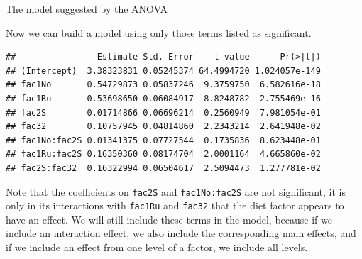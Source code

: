 \documentclass[
  ignorenonframetext,
]{beamer}
\newenvironment{Shaded}{\begin{snugshade}}{\end{snugshade}}
\newcommand{\DataTypeTok}[1]{\textcolor[rgb]{0.13,0.29,0.53}{#1}}
\newcommand{\KeywordTok}[1]{\textcolor[rgb]{0.13,0.29,0.53}{\textbf{#1}}}
\newcommand{\NormalTok}[1]{#1}
\newcommand{\OperatorTok}[1]{\textcolor[rgb]{0.81,0.36,0.00}{\textbf{#1}}}
\newcommand{\StringTok}[1]{\textcolor[rgb]{0.31,0.60,0.02}{#1}}
\begin{document}
\begin{frame}[fragile]{The model suggested by the ANOVA}
\protect\hypertarget{the-model-suggested-by-the-anova}{}

Now we can build a model using only those terms listed as significant.
\scriptsize

\begin{Shaded}
\end{Shaded}

\begin{verbatim}
##                Estimate Std. Error    t value      Pr(>|t|)
## (Intercept)  3.38323831 0.05245374 64.4994720 1.024057e-149
## fac1No       0.54729873 0.05837246  9.3759750  6.582616e-18
## fac1Ru       0.53698650 0.06084917  8.8248782  2.755469e-16
## fac2S        0.01714866 0.06696214  0.2560949  7.981054e-01
## fac32        0.10757945 0.04814860  2.2343214  2.641948e-02
## fac1No:fac2S 0.01341375 0.07727544  0.1735836  8.623448e-01
## fac1Ru:fac2S 0.16350360 0.08174704  2.0001164  4.665860e-02
## fac2S:fac32  0.16322994 0.06504617  2.5094473  1.277781e-02
\end{verbatim}

\normalsize

Note that the coefficients on \texttt{fac2S} and \texttt{fac1No:fac2S}
are not significant, it is only in its interactions with \texttt{fac1Ru}
and \texttt{fac32} that the diet factor appears to have an effect. We
will still include these terms in the model, because if we include an
interaction effect, we also include the corresponding main effects, and
if we include an effect from one level of a factor, we include all
levels.

\end{frame}
\end{document}
